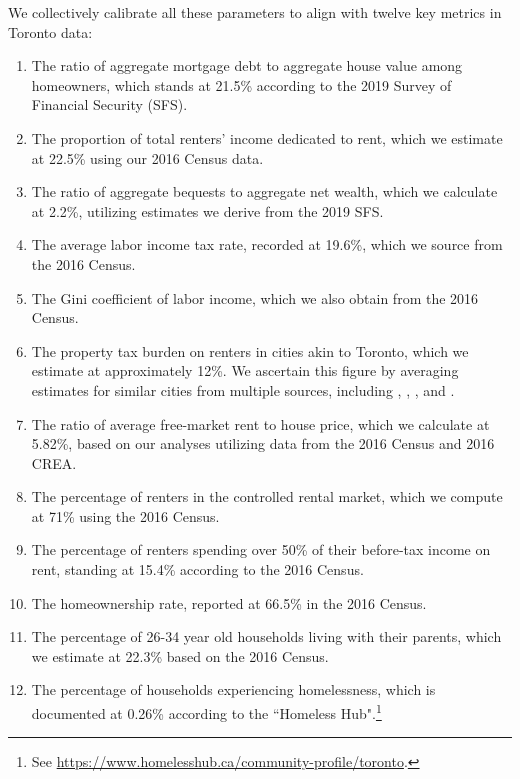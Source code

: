 \documentclass[parskip=full]{article}
\begin{document}
We collectively calibrate all these parameters to align with twelve key metrics in Toronto data:

\begin{enumerate}
    \item The ratio of aggregate mortgage debt to aggregate house value among homeowners, which stands at 21.5\% according to the 2019 Survey of Financial Security (SFS).
    \item The proportion of total renters' income dedicated to rent, which we estimate at 22.5\% using our 2016 Census data.
    \item The ratio of aggregate bequests to aggregate net wealth, which we calculate at 2.2\%, utilizing estimates we derive from the 2019 SFS.
    \item The average labor income tax rate, recorded at 19.6\%, which we source from the 2016 Census.
    \item The Gini coefficient of labor income, which we also obtain from the 2016 Census.
    \item The property tax burden on renters in cities akin to Toronto, which we estimate at approximately 12\%. We ascertain this figure by averaging estimates for similar cities from multiple sources, including \citet{cy-1994}, \citet{susin-2002}, \citet{fack-2006}, and \citet{sy-2020}.
    \item The ratio of average free-market rent to house price, which we calculate at 5.82\%, based on our analyses utilizing data from the 2016 Census and 2016 CREA.
    \item The percentage of renters in the controlled rental market, which we compute at 71\% using the 2016 Census. 
    \item The percentage of renters spending over 50\% of their before-tax income on rent, standing at 15.4\% according to the 2016 Census.
    \item The homeownership rate, reported at 66.5\% in the 2016 Census.
    \item The percentage of 26-34 year old households living with their parents, which we estimate at 22.3\% based on the 2016 Census.
    \item The percentage of households experiencing homelessness, which is documented at 0.26\% according to the ``Homeless Hub".\footnote{See \url{https://www.homelesshub.ca/community-profile/toronto}.}
\end{enumerate}
\end{document}
